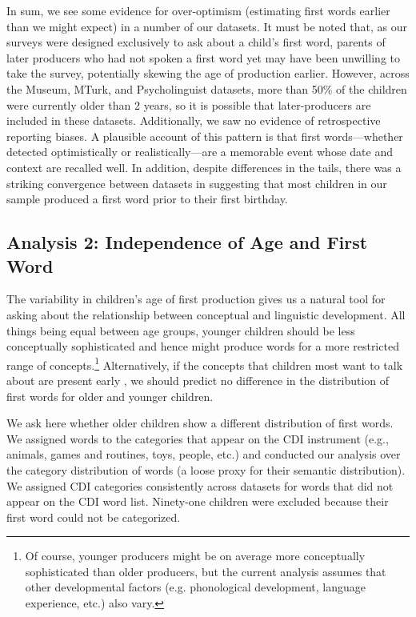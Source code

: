 \documentclass[10pt,letterpaper]{article}
\begin{document}
In sum, we see some evidence for over-optimism (estimating first words earlier than we might expect) in a number of our datasets. It must be noted that, as our surveys were designed exclusively to ask about a child's first word, parents of later producers who had not spoken a first word yet may have been unwilling to take the survey, potentially skewing the age of production earlier. However, across the Museum, MTurk, and Psycholinguist datasets, more than 50\% of the children were currently older than 2 years, so it is possible that later-producers are included in these datasets. Additionally, we saw no evidence of retrospective reporting biases. A plausible account of this pattern is that first words---whether detected optimistically or realistically---are a memorable event whose date and context are recalled well. In addition, despite differences in the tails, there was a striking convergence between datasets in suggesting that most children in our sample produced a first word prior to their first birthday. 

\vspace{-.2em}
\subsection{Analysis 2: Independence of Age and First Word}

The variability in children's age of first production gives us a natural tool for asking about the relationship between conceptual and linguistic development. All things being equal between age groups, younger children should be less conceptually sophisticated and hence might produce words for a more restricted range of concepts.\footnote{Of course, younger producers might be on average more conceptually sophisticated than older producers, but the current analysis assumes that other developmental factors (e.g. phonological development, language experience, etc.) also vary.} Alternatively, if the concepts that children most want to talk about are present early \cite{snedeker2007,snedeker2012,gleitman1990}, we should predict no difference in the distribution of first words for older and younger children. 

We ask here whether older children show a different distribution of first words. We assigned words to the categories that appear on the CDI instrument (e.g., animals, games and routines, toys, people, etc.) and conducted our analysis over the category distribution of words (a loose proxy for their semantic distribution). We assigned CDI categories consistently across datasets for words that did not appear on the CDI word list. Ninety-one children were excluded because their first word could not be categorized. 
\end{document}
